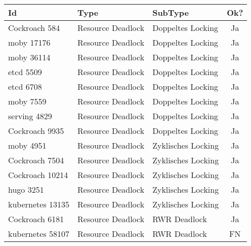 \begin{longtable}[c]{|l|l|l|c|}
  \hline
  \textbf{Id} & \textbf{Type}  & \textbf{SubType}    & \multicolumn{1}{l|}{\textbf{Ok?}} \\ \hline
  \endfirsthead
  \endhead
  Cockroach 584      & Resource Deadlock      & Doppeltes Locking      & Ja                                   \\ \hline
  moby 17176      & Resource Deadlock      & Doppeltes Locking      & Ja                                   \\ \hline
  moby 36114      & Resource Deadlock      & Doppeltes Locking      & Ja                                   \\ \hline
  etcd 5509      & Resource Deadlock      & Doppeltes Locking      & Ja                                   \\ \hline
  etcd 6708      & Resource Deadlock      & Doppeltes Locking      & Ja                                   \\ \hline
  moby 7559      & Resource Deadlock      & Doppeltes Locking      & Ja                                   \\ \hline
  serving 4829      & Resource Deadlock      & Doppeltes Locking      & Ja                                   \\ \hline
  Cockroach 9935      & Resource Deadlock      & Doppeltes Locking      & Ja                                   \\ \hline
  moby 4951      & Resource Deadlock      & Zyklisches Locking     & Ja                                   \\ \hline
  Cockroach 7504      & Resource Deadlock      & Zyklisches Locking     & Ja                                   \\ \hline
  Cockroach 10214      & Resource Deadlock      & Zyklisches Locking     & Ja                                   \\ \hline
  hugo 3251      & Resource Deadlock      & Zyklisches Locking     & Ja                                   \\ \hline
  kubernetes 13135      & Resource Deadlock      & Zyklisches Locking     & Ja                                   \\ \hline
  Cockroach 6181      & Resource Deadlock      & RWR Deadlock           & Ja                                   \\ \hline
  kubernetes 58107      & Resource Deadlock      & RWR Deadlock           & FN                                 \\ \hline

\end{longtable}
